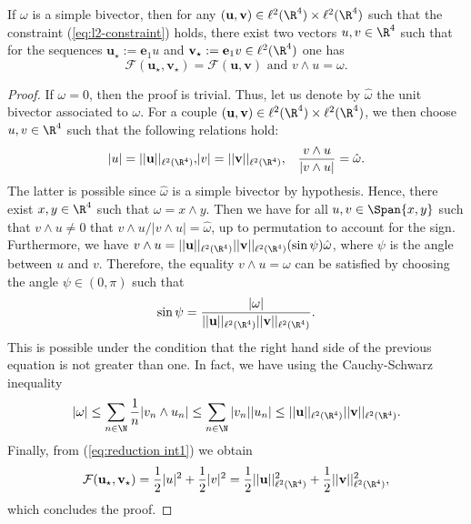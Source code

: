 \begin{proposition}
\label{prop:simple reduction}
If $\omega$ is a simple bivector, then for any $(\mathbf{u}, \mathbf{v}) \in \ell^2(\R^4) \times \ell^2(\R^4)$ such that the constraint (\ref{eq:l2-constraint}) holds, there exist two vectors $u,v \in \R^4$ such that for the sequences $\mathbf{u}_{\star} := \mathbf{e}_1 u$ and $\mathbf{v}_\star := \mathbf{e}_1 v \in \ell^2(\R^4)$ one has 
\begin{equation}
\mathcal{F}(\mathbf{u_{\star}}, \mathbf{v_{\star}}) = \mathcal{F}(\mathbf{u}, \mathbf{v}) \text{ and } v \wedge u = \omega.
\end{equation}
\end{proposition}

\begin{proof}
If $\omega = 0$, then the proof is trivial. Thus, let us denote by $\hat{\omega}$ the unit bivector associated to $\omega$. For a couple $(\mathbf{u}, \mathbf{v}) \in \ell^2(\R^4) \times \ell^2(\R^4)$, we then choose $u,v \in \R^4$ such that the following relations hold:
\begin{eqnarray}
\label{eq:reduction int1}
	|u| = ||\mathbf{u} ||_{\ell^2(\R^4)}, &  |v| = ||\mathbf{v} ||_{\ell^2(\R^4)} , & \frac{v \wedge u}{|v \wedge u|} = \hat{\omega}.
\end{eqnarray}
The latter is possible since $\hat{\omega}$ is a simple bivector by hypothesis. Hence, there exist $x, y \in \R^4$ such that $\omega = x \wedge y$. Then we have for all $u, v \in \Span\{x,y\}$ such that $v \wedge u \neq 0$ that $v \wedge u/|v \wedge u| = \hat{\omega}$, up to permutation to account for the sign. Furthermore, we have $v \wedge u = ||\mathbf{u}||_{\ell^2(\R^4)} ||\mathbf{v}||_{\ell^2(\R^4)} (\sin\psi)\hat{\omega}$, where $\psi$ is the angle between $u$ and $v$. Therefore, the equality $v \wedge u = \omega$ can be satisfied by choosing the angle $\psi \in (0, \pi)$ such that
\begin{equation}
 \sin \psi = \frac{|\omega|}{||\mathbf{u}||_{\ell^2(\R^4)} ||\mathbf{v} ||_{\ell^2(\R^4)}}.
 \end{equation}
This is possible under the condition that the right hand side  of the previous equation is not greater than one. In fact, we have using the Cauchy-Schwarz inequality
\begin{equation}
|\omega| \leq \sum_{n \in \N} \frac{1}{n} |v_n \wedge u_n| \leq \sum_{n \in \N} |v_n| |u_n| \leq ||\mathbf{u} ||_{\ell^2(\R^4)} ||\mathbf{v} ||_{\ell^2(\R^4)}.
\end{equation}
Finally, from (\ref{eq:reduction int1}) we obtain
\begin{equation}
\mathcal{F}(\mathbf{u_\star}, \mathbf{v_{\star}}) = \frac{1}{2} |u|^2 + \frac{1}{2} |v|^2 = \frac{1}{2} ||\mathbf{u}||_{\ell^2(\R^4)}^2 + \frac{1}{2} ||\textbf{v}||_{\ell^2(\R^4)}^2,
\end{equation}
which concludes the proof.
\end{proof}

